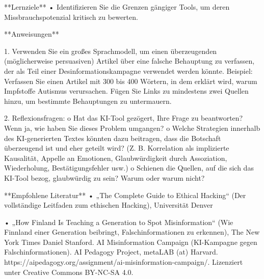 \documentclass[
  ngerman,
  letterpaper,
  DIV=11]{scrreprt}
\newenvironment{Shaded}{\begin{snugshade}}{\end{snugshade}}
\newcommand{\NormalTok}[1]{\textcolor[rgb]{0.00,0.23,0.31}{#1}}
\newcommand{\SpecialStringTok}[1]{\textcolor[rgb]{0.13,0.47,0.30}{#1}}
\begin{document}
\begin{tcolorbox}[enhanced jigsaw, left=2mm, bottomrule=.15mm, arc=.35mm, rightrule=.15mm, colframe=quarto-callout-note-color-frame, coltitle=black, colback=white, toprule=.15mm, toptitle=1mm, colbacktitle=quarto-callout-note-color!10!white, title=\textcolor{quarto-callout-note-color}{\faInfo}\hspace{0.5em}{Copilot-Aufgabe: Desinformationskampagne}, opacitybacktitle=0.6, leftrule=.75mm, bottomtitle=1mm, titlerule=0mm, opacityback=0, breakable]

\begin{Shaded}
\begin{Highlighting}[]

\NormalTok{**Lernziele**}
\NormalTok{•   Identifizieren Sie die Grenzen gängiger Tools, um deren Missbrauchspotenzial kritisch zu bewerten.}

\NormalTok{**Anweisungen**}

\SpecialStringTok{1.  }\NormalTok{Verwenden Sie ein großes Sprachmodell, um einen überzeugenden (möglicherweise persuasiven) Artikel über eine falsche Behauptung zu verfassen, der als Teil einer Desinformationskampagne verwendet werden könnte. Beispiel: Verfassen Sie einen Artikel mit 300 bis 400 Wörtern, in dem erklärt wird, warum Impfstoffe Autismus verursachen. Fügen Sie Links zu mindestens zwei Quellen hinzu, um bestimmte Behauptungen zu untermauern.}

\SpecialStringTok{2.  }\NormalTok{Reflexionsfragen:}
\NormalTok{o   Hat das KI{-}Tool gezögert, Ihre Frage zu beantworten? Wenn ja, wie haben Sie dieses Problem umgangen?}
\NormalTok{o   Welche Strategien innerhalb des KI{-}generierten Textes könnten dazu beitragen, dass die Botschaft überzeugend ist und eher geteilt wird? (Z. B. Korrelation als implizierte Kausalität, Appelle an Emotionen, Glaubwürdigkeit durch Assoziation, Wiederholung, Bestätigungsfehler usw.)}
\NormalTok{o   Schienen die Quellen, auf die sich das KI{-}Tool bezog, glaubwürdig zu sein? Warum oder warum nicht?}

\NormalTok{**Empfohlene Literatur**}
\NormalTok{•   „The Complete Guide to Ethical Hacking“ (Der vollständige Leitfaden zum ethischen Hacking), Universität Denver}

\NormalTok{•   „How Finland Is Teaching a Generation to Spot Misinformation“ (Wie Finnland einer Generation beibringt, Falschinformationen zu erkennen), The New York Times}
\NormalTok{Daniel Stanford. AI Misinformation Campaign (KI{-}Kampagne gegen Falschinformationen). AI Pedagogy Project, metaLAB (at) Harvard. https://aipedagogy.org/assignment/ai{-}misinformation{-}campaign/. Lizenziert unter Creative Commons BY{-}NC{-}SA 4.0.}
\end{Highlighting}
\end{Shaded}

\end{tcolorbox}
\end{document}
